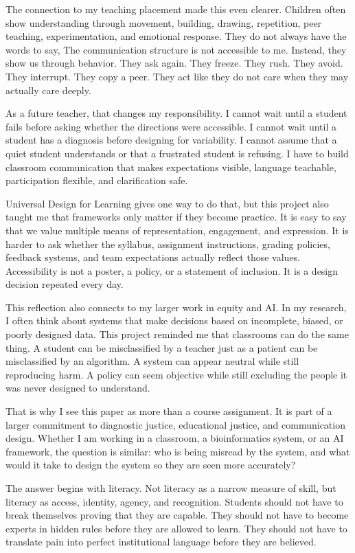 \documentclass[12pt]{article}
\begin{document}
The connection to my teaching placement made this even clearer. Children often show understanding through movement, building, drawing, repetition, peer teaching, experimentation, and emotional response. They do not always have the words to say, The communication structure is not accessible to me. Instead, they show us through behavior. They ask again. They freeze. They rush. They avoid. They interrupt. They copy a peer. They act like they do not care when they may actually care deeply.

As a future teacher, that changes my responsibility. I cannot wait until a student fails before asking whether the directions were accessible. I cannot wait until a student has a diagnosis before designing for variability. I cannot assume that a quiet student understands or that a frustrated student is refusing. I have to build classroom communication that makes expectations visible, language teachable, participation flexible, and clarification safe.

Universal Design for Learning gives one way to do that, but this project also taught me that frameworks only matter if they become practice. It is easy to say that we value multiple means of representation, engagement, and expression. It is harder to ask whether the syllabus, assignment instructions, grading policies, feedback systems, and team expectations actually reflect those values. Accessibility is not a poster, a policy, or a statement of inclusion. It is a design decision repeated every day.

This reflection also connects to my larger work in equity and AI. In my research, I often think about systems that make decisions based on incomplete, biased, or poorly designed data. This project reminded me that classrooms can do the same thing. A student can be misclassified by a teacher just as a patient can be misclassified by an algorithm. A system can appear neutral while still reproducing harm. A policy can seem objective while still excluding the people it was never designed to understand.

That is why I see this paper as more than a course assignment. It is part of a larger commitment to diagnostic justice, educational justice, and communication design. Whether I am working in a classroom, a bioinformatics system, or an AI framework, the question is similar: who is being misread by the system, and what would it take to design the system so they are seen more accurately?

The answer begins with literacy. Not literacy as a narrow measure of skill, but literacy as access, identity, agency, and recognition. Students should not have to break themselves proving that they are capable. They should not have to become experts in hidden rules before they are allowed to learn. They should not have to translate pain into perfect institutional language before they are believed.
\end{document}
